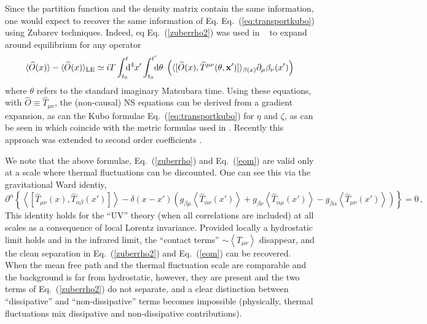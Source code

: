 \documentclass[12pt,onecolumn,showpacs,amssymb,aps,nofootinbib,floatfix]{revtex4-2}
\newcommand{\ave}[1]{\left\langle #1 \right\rangle}
\renewcommand{\eqref}[1]{Eq.~(\ref{#1})}
\newcommand{\di}{{\rm d}}
\def\wT{{\widehat T}}
\begin{document}
      Since the partition function and the density matrix contain the same information\cite{nishioka}, one would expect to recover the same information of Eq. \eqref{eq:transportkubo} using Zubarev techniques.   Indeed, eq \eqref{zuberrho2} was used in  ~\cite{zubbec} to expand around equilibrium for any operator
	\begin{equation}
		\label{eom}
		\langle \widehat O (x) \rangle - \langle \widehat O (x) \rangle_{\rm LE}
		\simeq i T \int_{t_0}^{t} \!\!\! \di^4 x'
		\int_{t_0}^{t'} \!\!\! \di \theta \; \left(\langle
		[\widehat O(x),\wT^{\mu\nu}(\theta,{\bf x}')] \rangle_{\beta(x)} \partial_\mu
		\beta_\nu(x')  \right)
	\end{equation}
	where $\theta$ refers to the standard imaginary Matsubara time.
	Using these equations, with $\hat{O}\equiv \hat{T}_{\mu \nu}$, the (non-causal) NS equations can be derived from a gradient expansion, as can the Kubo formulae \eqref{eq:transportkubo} for $\eta$ and $\zeta$, as can be seen in \cite{zubbec} which coincide with the metric formulas used in \cite{sonreview}.  Recently this approach was extended to second order coefficients \cite{dirkis}.\color{black}

        \color{black}
        We note that the above formulae, \eqref{zuberrho} and \eqref{eom} are valid only at a scale where thermal fluctuations can be discounted.    One can see this via the gravitational Ward identiy,
       \cite{boulware,jeon,jeon2}
        	\begin{equation}
		\label{ward}
		\partial^\alpha \left\{ \ave{\left[ \hat{T}_{\mu \nu}(x),\hat{T}_{\alpha \beta} (x') \right]} - 
		\delta(x-x') \left( g_{\beta \mu} \ave{\hat{T}_{\alpha \nu}(x')} + g_{\beta \nu} \ave{\hat{T}_{\alpha \mu}(x')}  
		- g_{\beta \alpha} \ave{\hat{T}_{\mu \nu}(x')}  \right) \right\} =0\,,
	\end{equation}
This identity holds for the ``UV'' theory (when all correlations are included) at all scales \cite{jeon2} as a consequence of local Lorentz invariance.    Provided locally a hydrostatic limit holds and in the infrared limit, the ``contact terms'' $\sim \ave{T_{\mu \nu}}$ disappear, and the clean separation in \eqref{zuberrho2} and \eqref{eom} can be recovered.     When the mean free path and the thermal fluctuation scale are comparable and the background is far from hydrostatic, however, they are present and the two terms of \eqref{zuberrho2} \color{black}do not separate, and a clear distinction between ``dissipative'' and ``non-dissipative'' terms becomes impossible (physically, thermal fluctuations mix dissipative and non-dissipative contributions)\color{black}.        
\end{document}
